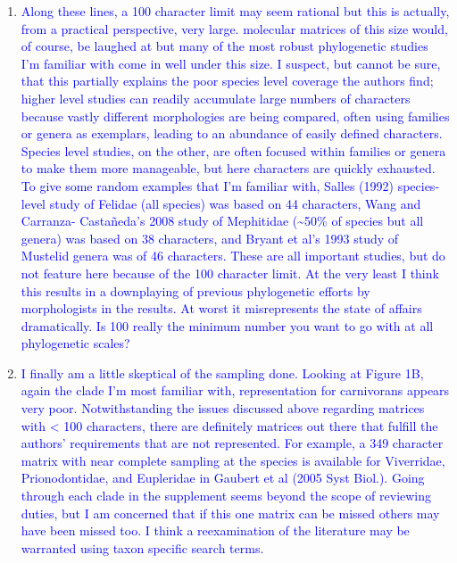 \documentclass[12pt,letterpaper]{article}
\begin{document}
\begin{enumerate}
\item{\textcolor{blue}{Along these lines, a 100 character limit may seem rational but this is actually, from a practical perspective, very large. molecular matrices of this size would, of course, be laughed at but many of the most robust phylogenetic studies I'm familiar with come in well under this size. I suspect, but cannot be sure, that this partially explains the poor species level coverage the authors find; higher level studies can readily accumulate large numbers of characters because vastly different morphologies are being compared, often using families or genera as exemplars, leading to an abundance of easily defined characters. Species level studies, on the other, are often focused within families or genera to make them more manageable, but here characters are quickly exhausted. To give some random examples that I'm familiar with, Salles (1992) species-level study of Felidae (all species) was based on 44 characters, Wang and Carranza- Casta\~{n}eda's 2008 study of Mephitidae (\textasciitilde50\% of species but all genera) was based on 38 characters, and Bryant et al's 1993 study of Mustelid genera was of 46 characters. These are all important studies, but do not feature here because of the 100 character limit. At the very least I think this results in a downplaying of previous phylogenetic efforts by morphologists in the results. At worst it misrepresents the state of affairs dramatically. Is 100 really the minimum number you want to go with at all phylogenetic scales?}}




\item{\textcolor{blue}{I finally am a little skeptical of the sampling done. Looking at Figure 1B, again the clade I'm most familiar with, representation for carnivorans appears very poor. Notwithstanding the issues discussed above regarding matrices with < 100 characters, there are definitely matrices out there that fulfill the authors' requirements that are not represented. For example, a 349 character matrix with near complete sampling at the species is available for Viverridae, Prionodontidae, and Eupleridae in Gaubert et al (2005 Syst Biol.). Going through each clade in the supplement seems beyond the scope of reviewing duties, but I am concerned that if this one matrix can be missed others may have been missed too. I think a reexamination of the literature may be warranted using taxon specific search terms.}}


\end{enumerate}
\end{document}
